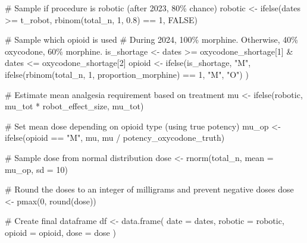 \documentclass[
  letterpaper,
  DIV=11,
  numbers=noendperiod]{scrreprt}
\newenvironment{Shaded}{\begin{snugshade}}{\end{snugshade}}
\newcommand{\AttributeTok}[1]{\textcolor[rgb]{0.40,0.45,0.13}{#1}}
\newcommand{\CommentTok}[1]{\textcolor[rgb]{0.37,0.37,0.37}{#1}}
\newcommand{\ConstantTok}[1]{\textcolor[rgb]{0.56,0.35,0.01}{#1}}
\newcommand{\DecValTok}[1]{\textcolor[rgb]{0.68,0.00,0.00}{#1}}
\newcommand{\FloatTok}[1]{\textcolor[rgb]{0.68,0.00,0.00}{#1}}
\newcommand{\FunctionTok}[1]{\textcolor[rgb]{0.28,0.35,0.67}{#1}}
\newcommand{\NormalTok}[1]{\textcolor[rgb]{0.00,0.23,0.31}{#1}}
\newcommand{\OtherTok}[1]{\textcolor[rgb]{0.00,0.23,0.31}{#1}}
\newcommand{\SpecialCharTok}[1]{\textcolor[rgb]{0.37,0.37,0.37}{#1}}
\newcommand{\StringTok}[1]{\textcolor[rgb]{0.13,0.47,0.30}{#1}}
\begin{document}
{\begin{Shaded}
\begin{Highlighting}[]
  \CommentTok{\# Sample if procedure is robotic (after 2023, 80\% chance)}
\NormalTok{  robotic }\OtherTok{\textless{}{-}} \FunctionTok{ifelse}\NormalTok{(dates }\SpecialCharTok{\textgreater{}=}\NormalTok{ t\_robot, }\FunctionTok{rbinom}\NormalTok{(total\_n, }\DecValTok{1}\NormalTok{, }\FloatTok{0.8}\NormalTok{) }\SpecialCharTok{==} \DecValTok{1}\NormalTok{, }\ConstantTok{FALSE}\NormalTok{)}

  \CommentTok{\# Sample which opioid is used}
  \CommentTok{\# During 2024, 100\% morphine. Otherwise, 40\% oxycodone, 60\% morphine.}
\NormalTok{  is\_shortage }\OtherTok{\textless{}{-}}\NormalTok{ dates }\SpecialCharTok{\textgreater{}=}\NormalTok{ oxycodone\_shortage[}\DecValTok{1}\NormalTok{] }\SpecialCharTok{\&}\NormalTok{ dates }\SpecialCharTok{\textless{}=}\NormalTok{ oxycodone\_shortage[}\DecValTok{2}\NormalTok{]}
\NormalTok{  opioid }\OtherTok{\textless{}{-}} \FunctionTok{ifelse}\NormalTok{(is\_shortage, }\StringTok{"M"}\NormalTok{,}
    \FunctionTok{ifelse}\NormalTok{(}\FunctionTok{rbinom}\NormalTok{(total\_n, }\DecValTok{1}\NormalTok{, proportion\_morphine) }\SpecialCharTok{==} \DecValTok{1}\NormalTok{, }\StringTok{"M"}\NormalTok{, }\StringTok{"O"}\NormalTok{)}
\NormalTok{  )}

  \CommentTok{\# Estimate mean analgesia requirement based on treatment}
\NormalTok{  mu }\OtherTok{\textless{}{-}} \FunctionTok{ifelse}\NormalTok{(robotic, mu\_tot }\SpecialCharTok{*}\NormalTok{ robot\_effect\_size, mu\_tot)}

  \CommentTok{\# Set mean dose depending on opioid type (using true potency)}
\NormalTok{  mu\_op }\OtherTok{\textless{}{-}} \FunctionTok{ifelse}\NormalTok{(opioid }\SpecialCharTok{==} \StringTok{"M"}\NormalTok{, mu, mu }\SpecialCharTok{/}\NormalTok{ potency\_oxycodone\_truth)}

  \CommentTok{\# Sample dose from normal distribution}
\NormalTok{  dose }\OtherTok{\textless{}{-}} \FunctionTok{rnorm}\NormalTok{(total\_n, }\AttributeTok{mean =}\NormalTok{ mu\_op, }\AttributeTok{sd =} \DecValTok{10}\NormalTok{)}

  \CommentTok{\# Round the doses to an integer of milligrams and prevent negative doses}
\NormalTok{  dose }\OtherTok{\textless{}{-}} \FunctionTok{pmax}\NormalTok{(}\DecValTok{0}\NormalTok{, }\FunctionTok{round}\NormalTok{(dose))}

  \CommentTok{\# Create final dataframe}
\NormalTok{  df }\OtherTok{\textless{}{-}} \FunctionTok{data.frame}\NormalTok{(}
    \AttributeTok{date =}\NormalTok{ dates,}
    \AttributeTok{robotic =}\NormalTok{ robotic,}
    \AttributeTok{opioid =}\NormalTok{ opioid,}
    \AttributeTok{dose =}\NormalTok{ dose}
\NormalTok{  )}


\end{Highlighting}
\end{Shaded}}
\end{document}
